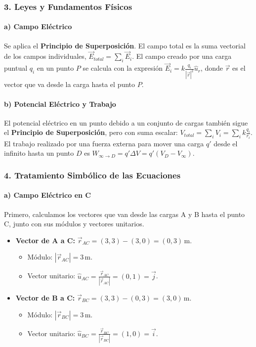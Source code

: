 \subsubsection*{3. Leyes y Fundamentos Físicos}
\paragraph*{a) Campo Eléctrico}
Se aplica el \textbf{Principio de Superposición}. El campo total es la suma vectorial de los campos individuales, $\vec{E}_{total} = \sum_i \vec{E}_i$. El campo creado por una carga puntual $q_i$ en un punto $P$ se calcula con la expresión $\vec{E}_i = k \frac{q_i}{|\vec{r}|^2} \hat{u}_r$, donde $\vec{r}$ es el vector que va desde la carga hasta el punto $P$.

\paragraph*{b) Potencial Eléctrico y Trabajo}
El potencial eléctrico en un punto debido a un conjunto de cargas también sigue el \textbf{Principio de Superposición}, pero con suma escalar: $V_{total} = \sum_i V_i = \sum_i k \frac{q_i}{r_i}$. El trabajo realizado por una fuerza externa para mover una carga $q'$ desde el infinito hasta un punto $D$ es $W_{\infty \to D} = q' \Delta V = q' (V_D - V_\infty)$.

\subsubsection*{4. Tratamiento Simbólico de las Ecuaciones}

\paragraph*{a) Campo Eléctrico en C}
Primero, calculamos los vectores que van desde las cargas A y B hasta el punto C, junto con sus módulos y vectores unitarios.
\begin{itemize}
    \setlength{\itemsep}{0pt}\setlength{\parskip}{0pt}
    \item \textbf{Vector de A a C:} $\vec{r}_{AC} = (3,3) - (3,0) = (0,3) \, \text{m}$.
    \begin{itemize}
        \item Módulo: $|\vec{r}_{AC}| = 3 \, \text{m}$.
        \item Vector unitario: $\hat{u}_{AC} = \frac{\vec{r}_{AC}}{|\vec{r}_{AC}|} = (0,1) = \vec{j}$.
    \end{itemize}
    \item \textbf{Vector de B a C:} $\vec{r}_{BC} = (3,3) - (0,3) = (3,0) \, \text{m}$.
    \begin{itemize}
        \item Módulo: $|\vec{r}_{BC}| = 3 \, \text{m}$.
        \item Vector unitario: $\hat{u}_{BC} = \frac{\vec{r}_{BC}}{|\vec{r}_{BC}|} = (1,0) = \vec{i}$.
    \end{itemize}
\end{itemize}

